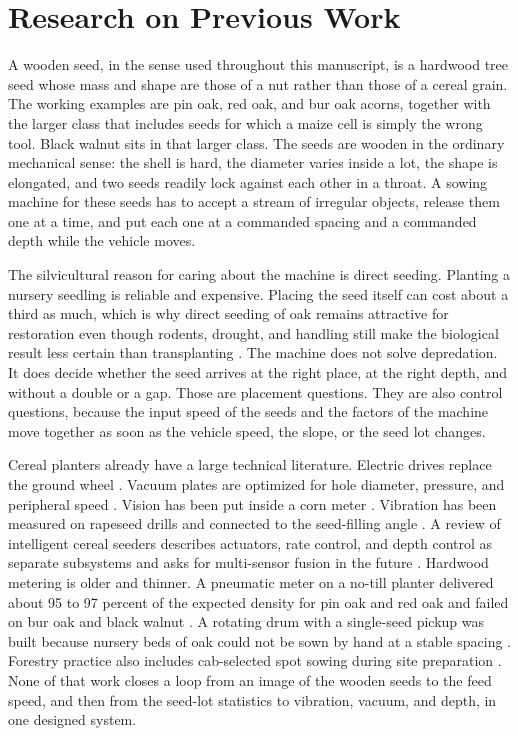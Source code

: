 \chapter{Research on Previous Work}
\label{ch:previous}

A wooden seed, in the sense used throughout this manuscript, is a hardwood tree seed whose mass and shape are those of a nut rather than those of a cereal grain. The working examples are pin oak, red oak, and bur oak acorns, together with the larger class that includes seeds for which a maize cell is simply the wrong tool. Black walnut sits in that larger class. The seeds are wooden in the ordinary mechanical sense: the shell is hard, the diameter varies inside a lot, the shape is elongated, and two seeds readily lock against each other in a throat. A sowing machine for these seeds has to accept a stream of irregular objects, release them one at a time, and put each one at a commanded spacing and a commanded depth while the vehicle moves.

The silvicultural reason for caring about the machine is direct seeding. Planting a nursery seedling is reliable and expensive. Placing the seed itself can cost about a third as much, which is why direct seeding of oak remains attractive for restoration even though rodents, drought, and handling still make the biological result less certain than transplanting \cite{lof2019,grossnickle2012,stanturf2014,fao2020}. The machine does not solve depredation. It does decide whether the seed arrives at the right place, at the right depth, and without a double or a gap. Those are placement questions. They are also control questions, because the input speed of the seeds and the factors of the machine move together as soon as the vehicle speed, the slope, or the seed lot changes.

Cereal planters already have a large technical literature. Electric drives replace the ground wheel \cite{aces2024,he2017,zhao2024}. Vacuum plates are optimized for hole diameter, pressure, and peripheral speed \cite{yazgi2007,karayel2004,singh2005,onal2012}. Vision has been put inside a corn meter \cite{borja2021}. Vibration has been measured on rapeseed drills and connected to the seed-filling angle \cite{wu2022,zhang2024vib}. A review of intelligent cereal seeders describes actuators, rate control, and depth control as separate subsystems and asks for multi-sensor fusion in the future \cite{liu2025review}. Hardwood metering is older and thinner. A pneumatic meter on a no-till planter delivered about 95 to 97 percent of the expected density for pin oak and red oak and failed on bur oak and black walnut \cite{wells1990}. A rotating drum with a single-seed pickup was built because nursery beds of oak could not be sown by hand at a stable spacing \cite{dinkel1991}. Forestry practice also includes cab-selected spot sowing during site preparation \cite{newforest}. None of that work closes a loop from an image of the wooden seeds to the feed speed, and then from the seed-lot statistics to vibration, vacuum, and depth, in one designed system.

